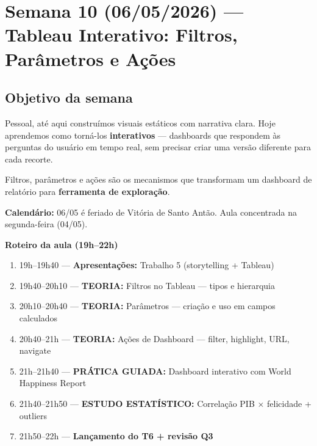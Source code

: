 
\chapter{Semana 10 (06/05/2026) — Tableau Interativo: Filtros, Parâmetros e Ações}

\section{Objetivo da semana}

Pessoal, até aqui construímos visuais estáticos com narrativa clara.
Hoje aprendemos como torná-los \textbf{interativos} — dashboards que
respondem às perguntas do usuário em tempo real, sem precisar criar uma
versão diferente para cada recorte.

Filtros, parâmetros e ações são os mecanismos que transformam um dashboard
de relatório para \textbf{ferramenta de exploração}.

\begin{NoteBox}
\textbf{Calendário:} 06/05 é feriado de Vitória de Santo Antão.
Aula concentrada na segunda-feira (04/05).
\end{NoteBox}

\begin{BoardBox}
\textbf{Roteiro da aula (19h–22h)}
\begin{enumerate}
  \item 19h–19h40 — \textbf{Apresentações:} Trabalho 5 (storytelling + Tableau)
  \item 19h40–20h10 — \textbf{TEORIA:} Filtros no Tableau — tipos e hierarquia
  \item 20h10–20h40 — \textbf{TEORIA:} Parâmetros — criação e uso em campos calculados
  \item 20h40–21h — \textbf{TEORIA:} Ações de Dashboard — filter, highlight, URL, navigate
  \item 21h–21h40 — \textbf{PRÁTICA GUIADA:} Dashboard interativo com World Happiness Report
  \item 21h40–21h50 — \textbf{ESTUDO ESTATÍSTICO:} Correlação PIB × felicidade + outliers
  \item 21h50–22h — \textbf{Lançamento do T6 + revisão Q3}
\end{enumerate}
\end{BoardBox}

